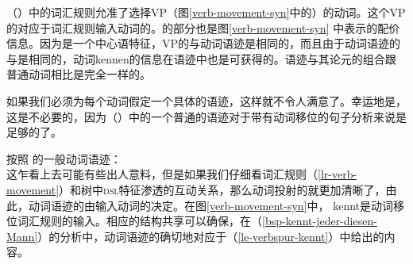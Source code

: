 \noindent
（）中的词汇规则允准了选择VP（图\ref{verb-movement-syn}中的）的动词。这个VP的\dslvc 对应于词汇规则输入动词的\locvc。\dslvc 的部分也是图\ref{verb-movement-syn} 中表示的配价信息。因为\dslc 是一个中心语特征，VP的\dslvc 与动词语迹是相同的，而且由于动词语迹的\locvc 与\dslvc 是相同的，动词kennen的\subcatc 信息在语迹中也是可获得的。语迹与其论元的组合跟普通动词相比是完全一样的。

如果我们必须为每个动词假定一个具体的语迹，这样就不令人满意了。幸运地是，这是不必要的，因为（）中的一个普通的语迹对于带有动词移位的句子分析来说是足够的了。

\eas
按照 的一般动词语迹：\\
\label{le-verbspur}
\zs
这乍看上去可能有些出人意料，但是如果我们仔细看词汇规则（\ref{lr-verb-movement}）和树中\textsc{dsl}特征渗透的互动关系，那么动词投射的\dslvc 就更加清晰了，由此，动词语迹的\localvc 由输入动词的\localvc 决定。在图\ref{verb-movement-syn}中， kennt是动词移位词汇规则的输入。相应的结构共享可以确保，在（\ref{bsp-kennt-jeder-diesen-Mann}）的分析中，动词语迹的\localvc 确切地对应于（\ref{le-verbspur-kennt}）中给出的内容。


